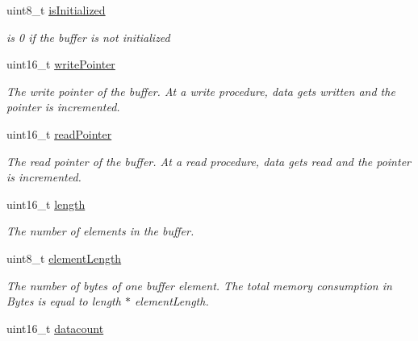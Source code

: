 \begin{DoxyCompactItemize}
\item 
uint8\+\_\+t \hyperlink{structbuffer__t_a226b259859e359bec68028e844a29d13}{is\+Initialized}\hypertarget{structbuffer__t_a226b259859e359bec68028e844a29d13}{}\label{structbuffer__t_a226b259859e359bec68028e844a29d13}

\begin{DoxyCompactList}\small\item\em is 0 if the buffer is not initialized \end{DoxyCompactList}\item 
uint16\+\_\+t \hyperlink{structbuffer__t_a497ab79d85c05cf11b3042d27c5a0dbb}{write\+Pointer}\hypertarget{structbuffer__t_a497ab79d85c05cf11b3042d27c5a0dbb}{}\label{structbuffer__t_a497ab79d85c05cf11b3042d27c5a0dbb}

\begin{DoxyCompactList}\small\item\em The write pointer of the buffer. At a write procedure, data gets written and the pointer is incremented. \end{DoxyCompactList}\item 
uint16\+\_\+t \hyperlink{structbuffer__t_aae80b6cbad55ddcee74d93a23af7f88f}{read\+Pointer}\hypertarget{structbuffer__t_aae80b6cbad55ddcee74d93a23af7f88f}{}\label{structbuffer__t_aae80b6cbad55ddcee74d93a23af7f88f}

\begin{DoxyCompactList}\small\item\em The read pointer of the buffer. At a read procedure, data gets read and the pointer is incremented. \end{DoxyCompactList}\item 
uint16\+\_\+t \hyperlink{structbuffer__t_a1892eba2086d12ac2b09005aeb09ea3b}{length}\hypertarget{structbuffer__t_a1892eba2086d12ac2b09005aeb09ea3b}{}\label{structbuffer__t_a1892eba2086d12ac2b09005aeb09ea3b}

\begin{DoxyCompactList}\small\item\em The number of elements in the buffer. \end{DoxyCompactList}\item 
uint8\+\_\+t \hyperlink{structbuffer__t_ad42232a8a992b5d0eb9daf58d83337ec}{element\+Length}\hypertarget{structbuffer__t_ad42232a8a992b5d0eb9daf58d83337ec}{}\label{structbuffer__t_ad42232a8a992b5d0eb9daf58d83337ec}

\begin{DoxyCompactList}\small\item\em The number of bytes of one buffer element. The total memory consumption in Bytes is equal to length $\ast$ element\+Length. \end{DoxyCompactList}\item 
uint16\+\_\+t \hyperlink{structbuffer__t_ac7e5e46f55ed6f23cd0c8630ca768f8b}{datacount}\hypertarget{structbuffer__t_ac7e5e46f55ed6f23cd0c8630ca768f8b}{}\label{structbuffer__t_ac7e5e46f55ed6f23cd0c8630ca768f8b}


\end{DoxyCompactItemize}
